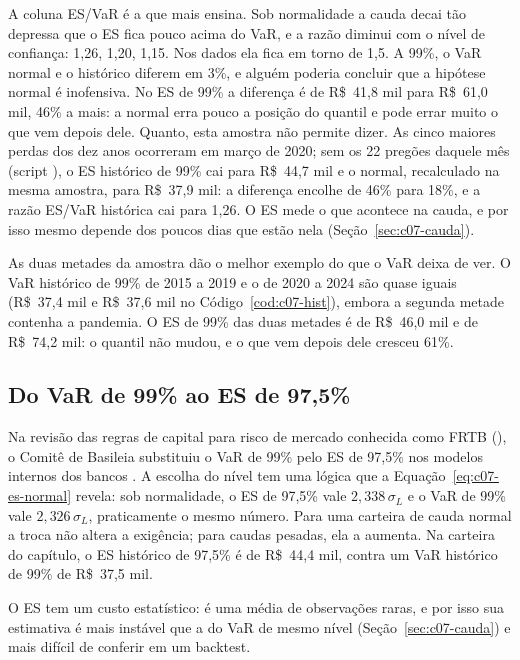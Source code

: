 A coluna ES/VaR é a que mais ensina. Sob normalidade a cauda decai tão depressa que o ES fica pouco acima do VaR, e a razão diminui com o nível de confiança: 1,26, 1,20, 1,15. Nos dados ela fica em torno de 1,5. A 99\%, o VaR normal e o histórico diferem em 3\%, e alguém poderia concluir que a hipótese normal é inofensiva. No ES de 99\% a diferença é de R\$~41,8 mil para R\$~61,0 mil, 46\% a mais: a normal erra pouco a posição do quantil e pode errar muito o que vem depois dele. Quanto, esta amostra não permite dizer. As cinco maiores perdas dos dez anos ocorreram em março de 2020; sem os 22 pregões daquele mês (script ), o ES histórico de 99\% cai para R\$~44,7 mil e o normal, recalculado na mesma amostra, para R\$~37,9 mil: a diferença encolhe de 46\% para 18\%, e a razão ES/VaR histórica cai para 1,26. O ES mede o que acontece na cauda, e por isso mesmo depende dos poucos dias que estão nela (Seção~\ref{sec:c07-cauda}).

As duas metades da amostra dão o melhor exemplo do que o VaR deixa de ver. O VaR histórico de 99\% de 2015 a 2019 e o de 2020 a 2024 são quase iguais (R\$~37,4 mil e R\$~37,6 mil no Código~\ref{cod:c07-hist}), embora a segunda metade contenha a pandemia. O ES de 99\% das duas metades é de R\$~46,0 mil e de R\$~74,2 mil: o quantil não mudou, e o que vem depois dele cresceu 61\%.

\subsection{Do VaR de 99\% ao ES de 97,5\%}

Na revisão das regras de capital para risco de mercado conhecida como FRTB (), o Comitê de Basileia substituiu o VaR de 99\% pelo ES de 97,5\% nos modelos internos dos bancos \citep{bcbs2019}. A escolha do nível tem uma lógica que a Equação~\eqref{eq:c07-es-normal} revela: sob normalidade, o ES de 97,5\% vale $2,338\,\sigma_L$ e o VaR de 99\% vale $2,326\,\sigma_L$, praticamente o mesmo número. Para uma carteira de cauda normal a troca não altera a exigência; para caudas pesadas, ela a aumenta. Na carteira do capítulo, o ES histórico de 97,5\% é de R\$~44,4 mil, contra um VaR histórico de 99\% de R\$~37,5 mil.

O ES tem um custo estatístico: é uma média de observações raras, e por isso sua estimativa é mais instável que a do VaR de mesmo nível (Seção~\ref{sec:c07-cauda}) e mais difícil de conferir em um backtest.

